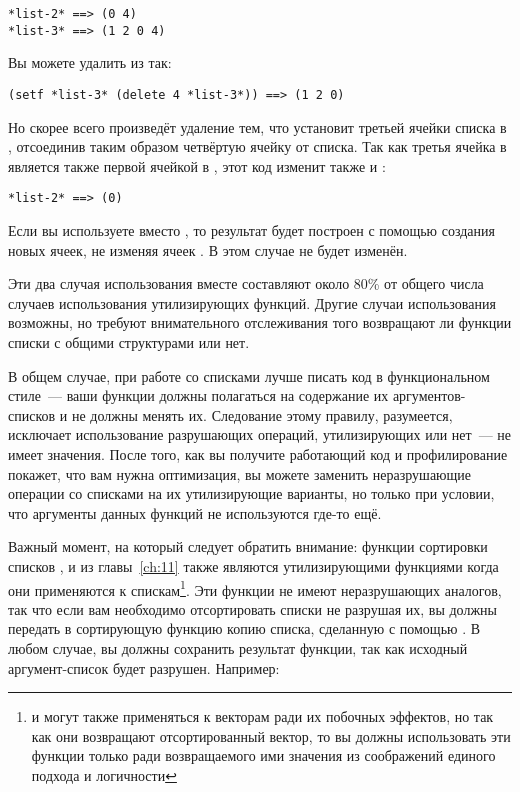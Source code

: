 \begin{lstlisting}
*list-2* ==> (0 4)
*list-3* ==> (1 2 0 4)
\end{lstlisting}

Вы можете удалить  из  так:

\begin{lstlisting}
(setf *list-3* (delete 4 *list-3*)) ==> (1 2 0)
\end{lstlisting}

Но  скорее всего произведёт удаление тем, что установит  третьей
ячейки списка в , отсоединив таким образом четвёртую ячейку от
списка. Так как третья ячейка в  является также первой ячейкой в ,
этот код изменит также и :

\begin{lstlisting}
*list-2* ==> (0)
\end{lstlisting}

Если вы используете  вместо , то результат будет построен с
помощью создания новых ячеек, не изменяя ячеек . В этом случае 
не будет изменён.

Эти два случая использования вместе составляют около 80\% от общего числа случаев
использования утилизирующих функций. Другие случаи использования возможны, но требуют
внимательного отслеживания того возвращают ли функции списки с общими структурами или нет.

В общем случае, при работе со списками лучше писать код в функциональном стиле~--- ваши
функции должны полагаться на содержание их аргументов-списков и не должны менять
их. Следование этому правилу, разумеется, исключает использование разрушающих операций,
утилизирующих или нет~--- не имеет значения. После того, как вы получите работающий код и
профилирование покажет, что вам нужна оптимизация, вы можете заменить неразрушающие
операции со списками на их утилизирующие варианты, но только при условии, что аргументы
данных функций не используются где-то ещё.

Важный момент, на который следует обратить внимание: функции сортировки списков
,  и  из главы~\ref{ch:11} также являются
утилизирующими функциями когда они применяются к спискам\footnote{ и
   могут также применяться к векторам ради их побочных эффектов, но
  так как они возвращают отсортированный вектор, то вы должны использовать эти функции только
  ради возвращаемого ими значения из соображений единого подхода и логичности}. Эти
функции не имеют неразрушающих аналогов, так что если вам необходимо отсортировать списки
не разрушая их, вы должны передать в сортирующую функцию копию списка, сделанную с помощью
. В любом случае, вы должны сохранить результат функции, так как исходный
аргумент-список будет разрушен. Например:

